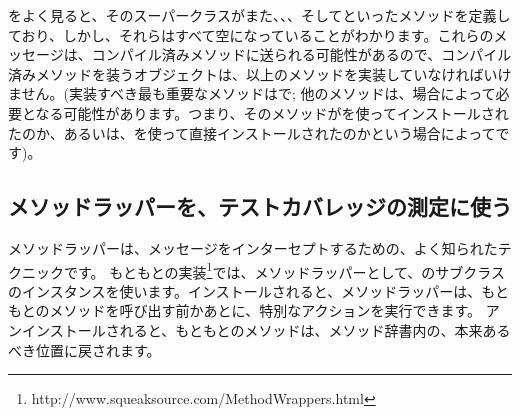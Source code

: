 \documentclass[a4paper,10pt,twoside]{book}
\begin{document}
をよく見ると、そのスーパークラスがまた、、、そしてといったメソッドを定義しており、しかし、それらはすべて空になっていることがわかります。これらのメッセージは、コンパイル済みメソッドに送られる可能性があるので、コンパイル済みメソッドを装うオブジェクトは、以上のメソッドを実装していなければいけません。(実装すべき最も重要なメソッドはで; 他のメソッドは、場合によって必要となる可能性があります。つまり、そのメソッドがを使ってインストールされたのか、あるいは、を使って直接インストールされたのかという場合によってです)。 %

\subsection{メソッドラッパーを、テストカバレッジの測定に使う}

メソッドラッパーは、メッセージをインターセプトするための、よく知られたテクニックです\cite{Bran98a}。
もともとの実装\footnote{http://www.squeaksource.com/MethodWrappers.html}では、メソッドラッパーとして、のサブクラスのインスタンスを使います。インストールされると、メソッドラッパーは、もともとのメソッドを呼び出す前かあとに、特別なアクションを実行できます。
アンインストールされると、もともとのメソッドは、メソッド辞書内の、本来あるべき位置に戻されます。
\end{document}
